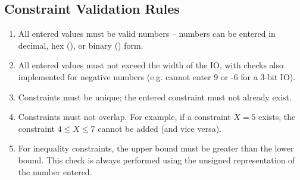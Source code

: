 \subsection{Constraint Validation Rules}
\begin{enumerate}
    \item All entered values must be valid numbers -- numbers can be entered in decimal, hex (), or binary () form.
    \item All entered values must not exceed the width of the IO, with checks also implemented for negative numbers (e.g. cannot enter 9 or -6 for a 3-bit IO).
    \item Constraints must be unique; the entered constraint must not already exist.
    \item Constraints must not overlap. For example, if a constraint $X=5$ exists, the constraint $4 \leq X \leq 7$ cannot be added (and vice versa).
    \item For inequality constraints, the upper bound must be greater than the lower bound. This check is always performed using the unsigned representation of the number entered.
\end{enumerate}

